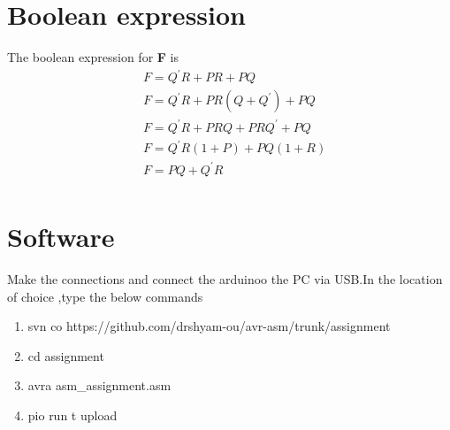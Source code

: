 \documentclass[journal,10pt,twocolumn]{article}
\begin{document}
\section*{\large Boolean expression}
The boolean expression for \textbf{F} is
\begin{align*}%
&F=Q^{\prime}R+PR+PQ\\
&F=Q^{\prime}R+PR(Q+Q^{\prime})+PQ\\
&F=Q^{\prime}R+PRQ+PRQ^{\prime}+PQ\\
&F=Q^{\prime}R(1+P)+PQ(1+R)\\
&F=PQ+Q^{\prime}R\\
\end{align*}

\section*{\large Software}
Make the connections and connect the arduinoo the PC via USB.In the location of choice ,type the below commands
\begin{enumerate}
\item svn co https://github.com/drshyam-ou/avr-asm/trunk/assignment
\item cd assignment
\item avra asm\_assignment.asm
\item pio run \-t upload
\end{enumerate}
\end{document}

